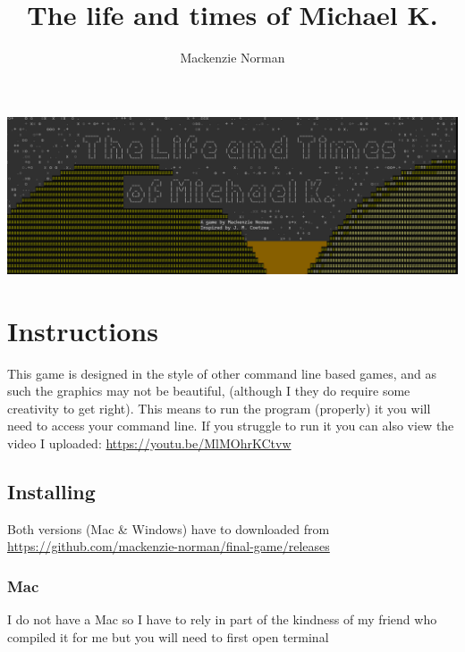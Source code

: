 \documentclass{article}
\title{The life and times of Michael K.}
\author{Mackenzie Norman}
\begin{document}
\maketitle
\begin{center}
    \includegraphics[width=\textwidth]{title_screen.png}
\end{center}
\section*{Instructions}
This game is designed in the style of other command line based games, and as such the graphics may not be beautiful, (although I they do require some creativity to get right). This means to run the program (properly) it you will need to access your command line.
If you struggle to run it you can also view the video I uploaded:  \url{https://youtu.be/MlMOhrKCtvw}
\paragraph{}

\subsection*{Installing}
Both versions (Mac \& Windows) have to downloaded from \url{https://github.com/mackenzie-norman/final-game/releases}
\subsubsection*{Mac}
I do not have a Mac so I have to rely in part of the kindness of my friend who compiled it for me but you will need to first open terminal \url{}
\end{document}
